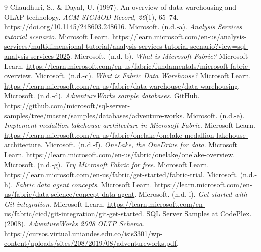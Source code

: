 \clearpage
{}
{}
\begin{thebibliography}{9}
 Chaudhuri, S., \& Dayal, U. (1997). An overview of data warehousing and OLAP technology. \textit{ACM SIGMOD Record, 26}(1), 65--74. \url{https://doi.org/10.1145/248603.248616}.
 Microsoft. (n.d.-a). \textit{Analysis Services tutorial scenario}. Microsoft Learn. \url{https://learn.microsoft.com/en-us/analysis-services/multidimensional-tutorial/analysis-services-tutorial-scenario?view=sql-analysis-services-2025}.
 Microsoft. (n.d.-b). \textit{What is Microsoft Fabric?} Microsoft Learn. \url{https://learn.microsoft.com/en-us/fabric/fundamentals/microsoft-fabric-overview}.
 Microsoft. (n.d.-c). \textit{What is Fabric Data Warehouse?} Microsoft Learn. \url{https://learn.microsoft.com/en-us/fabric/data-warehouse/data-warehousing}.
 Microsoft. (n.d.-d). \textit{AdventureWorks sample databases}. GitHub. \url{https://github.com/microsoft/sql-server-samples/tree/master/samples/databases/adventure-works}.
 Microsoft. (n.d.-e). \textit{Implement medallion lakehouse architecture in Microsoft Fabric}. Microsoft Learn. \url{https://learn.microsoft.com/en-us/fabric/onelake/onelake-medallion-lakehouse-architecture}.
 Microsoft. (n.d.-f). \textit{OneLake, the OneDrive for data}. Microsoft Learn. \url{https://learn.microsoft.com/en-us/fabric/onelake/onelake-overview}.
 Microsoft. (n.d.-g). \textit{Try Microsoft Fabric for free}. Microsoft Learn. \url{https://learn.microsoft.com/en-us/fabric/get-started/fabric-trial}.
 Microsoft. (n.d.-h). \textit{Fabric data agent concepts}. Microsoft Learn. \url{https://learn.microsoft.com/en-us/fabric/data-science/concept-data-agent}.
 Microsoft. (n.d.-i). \textit{Get started with Git integration}. Microsoft Learn. \url{https://learn.microsoft.com/en-us/fabric/cicd/git-integration/git-get-started}.
 SQL Server Samples at CodePlex. (2008). \textit{AdventureWorks 2008 OLTP Schema}. \url{https://cursos.virtual.uniandes.edu.co/isis3301/wp-content/uploads/sites/208/2019/08/adventureworks.pdf}.
\end{thebibliography}
